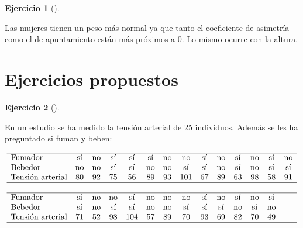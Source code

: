 \documentclass[
  spanish,
  a4paper,
]{scrreport}
\theoremstyle{definition}
\newtheorem{exercise}{Ejercicio}[chapter]
\theoremstyle{remark}
\begin{document}
\begin{exercise}[]
\begin{enumerate}
\begin{tcolorbox}
  Las mujeres tienen un peso más normal ya que tanto el coeficiente de
  asimetría como el de apuntamiento están más próximos a 0. Lo mismo
  ocurre con la altura.

  \end{tcolorbox}
\end{enumerate}

\end{exercise}

\section{Ejercicios propuestos}\label{ejercicios-propuestos-3}

\begin{exercise}[]\protect\hypertarget{exr-descriptiva-tension}{}\label{exr-descriptiva-tension}

En un estudio se ha medido la tensión arterial de 25 individuos. Además
se les ha preguntado si fuman y beben:

\[
\begin{array}{lccccccccccccc}
\hline
\mbox{Fumador}  & \mbox{sí} & \mbox{no} & \mbox{sí} & \mbox{sí} & \mbox{sí} & \mbox{no} & \mbox{no} & \mbox{sí} & \mbox{no} & \mbox{sí} & \mbox{no} & \mbox{sí} & \mbox{no} \\
\mbox{Bebedor} & \mbox{no} & \mbox{no} & \mbox{sí} & \mbox{sí} & \mbox{no} & \mbox{no} & \mbox{sí} & \mbox{sí} & \mbox{no} & \mbox{sí} & \mbox{no} & \mbox{sí} & \mbox{sí} \\
\mbox{Tensión arterial} & 80 & 92 & 75 & 56 & 89 & 93 & 101 & 67 & 89 & 63 & 98 & 58 & 91 \\
\hline
\\
\hline
\mbox{Fumador}  & \mbox{sí} & \mbox{no} & \mbox{no} & \mbox{sí} & \mbox{no} & \mbox{no} & \mbox{no} & \mbox{sí} & \mbox{no} & \mbox{sí} & \mbox{no} & \mbox{sí} \\
\mbox{Bebedor} & \mbox{sí} & \mbox{no} & \mbox{sí} & \mbox{sí} & \mbox{no} & \mbox{no} & \mbox{sí} & \mbox{sí} & \mbox{sí} & \mbox{no} & \mbox{sí} & \mbox{no} \\
\mbox{Tensión arterial} & 71 & 52 & 98 & 104 & 57 & 89 & 70 & 93 & 69 & 82 & 70 & 49 \\
\hline
\end{array}
\]


\end{exercise}
\end{document}
